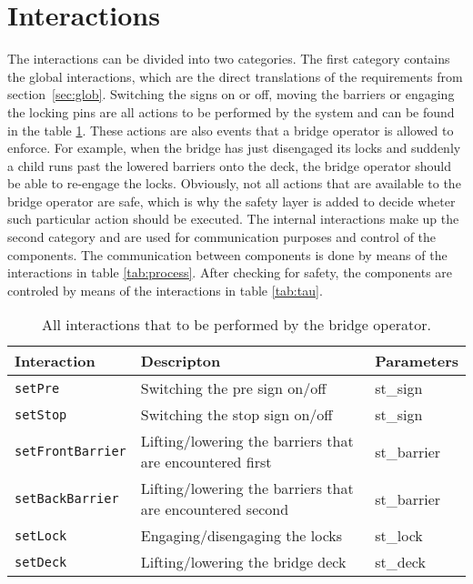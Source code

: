 \section{Interactions}
\label{sec:act}

The interactions can be divided into two categories. The first category contains the global interactions, which are the direct translations of the requirements from section~\ref{sec:glob}.
Switching the signs on or off, moving the barriers or engaging the locking pins are all actions to be performed by the system and can be found in the table \ref{tab:glob}. These actions are also events that a bridge operator is allowed to enforce. For example, when the bridge has just disengaged its locks and suddenly a child runs past the lowered barriers onto the deck, the bridge operator should be able to re-engage the locks. Obviously, not all actions that are available to the bridge operator are safe, which is why the safety layer is added to decide wheter such particular action should be executed.
The internal interactions make up the second category and are used for communication purposes and control of the components. The communication between components is done by means of the interactions in table \ref{tab:process}. After checking for safety, the components are controled by means of the interactions in table \ref{tab:tau}.
%
\begin{table}[htb]%
\begin{tabular}{lll}
      \textbf{Interaction} &	\textbf{Descripton}	&	\textbf{Parameters}\\
      \hline
      \texttt{setPre} & Switching the pre sign on/off & st\_sign\\
      \texttt{setStop} & Switching the stop sign on/off & st\_sign\\
      \texttt{setFrontBarrier} & Lifting/lowering the barriers that are encountered first & st\_barrier\\
      \texttt{setBackBarrier} & Lifting/lowering the barriers that are encountered second & st\_barrier\\
      \texttt{setLock} & Engaging/disengaging the locks & st\_lock\\
      \texttt{setDeck} & Lifting/lowering the bridge deck & st\_deck\\
\end{tabular}
\caption{All interactions that to be performed by the bridge operator.}
\label{tab:glob}
\end{table}
%
